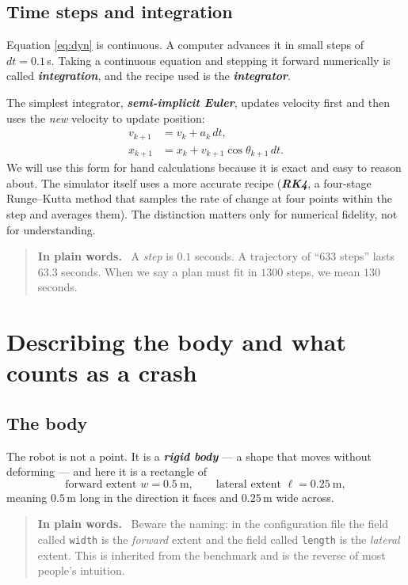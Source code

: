 \documentclass[11pt,a4paper]{article}
\newcommand{\defn}[1]{\textbf{\textit{#1}}}
\newenvironment{keypoint}
  {\begin{quote}\small\noindent\textbf{In plain words.}\ }
  {\end{quote}}
\begin{document}
\subsection{Time steps and integration}

Equation \eqref{eq:dyn} is continuous. A computer advances it in small steps of
$dt = 0.1$\,s. Taking a continuous equation and stepping it forward numerically is called
\defn{integration}, and the recipe used is the \defn{integrator}.

The simplest integrator, \defn{semi-implicit Euler}, updates velocity first and then uses
the \emph{new} velocity to update position:
\begin{align}
v_{k+1} &= v_k + a_k\, dt, \label{eq:euler-v}\\
x_{k+1} &= x_k + v_{k+1} \cos\theta_{k+1}\, dt. \label{eq:euler-x}
\end{align}
We will use this form for hand calculations because it is exact and easy to reason about.
The simulator itself uses a more accurate recipe (\defn{RK4}, a four-stage
Runge--Kutta method that samples the rate of change at four points within the step and
averages them). The distinction matters only for numerical fidelity, not for understanding.

\begin{keypoint}
A \emph{step} is $0.1$ seconds. A trajectory of ``633 steps'' lasts $63.3$ seconds. When
we say a plan must fit in $1300$ steps, we mean $130$ seconds.
\end{keypoint}

\section{Describing the body and what counts as a crash}

\subsection{The body}

The robot is not a point. It is a \defn{rigid body} --- a shape that moves without
deforming --- and here it is a rectangle of
\[
\text{forward extent } w = 0.5\ \text{m}, \qquad
\text{lateral extent } \ell = 0.25\ \text{m},
\]
meaning $0.5$\,m long in the direction it faces and $0.25$\,m wide across.

\begin{keypoint}
Beware the naming: in the configuration file the field called \texttt{width} is the
\emph{forward} extent and the field called \texttt{length} is the \emph{lateral} extent.
This is inherited from the benchmark and is the reverse of most people's intuition.
\end{keypoint}
\end{document}

